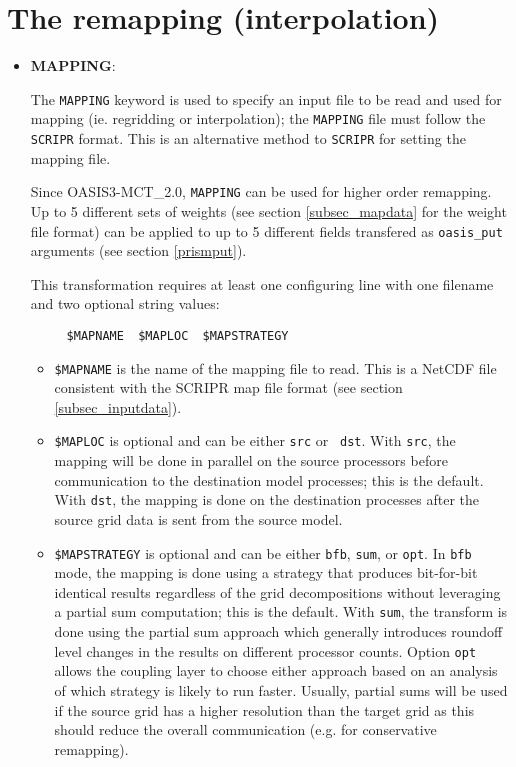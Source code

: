 
\section{The remapping (interpolation)}
\label{subsec_interp}

\begin{itemize}

\item {\bf MAPPING}:

  The {\tt MAPPING} keyword is used to specify an input file to be
  read and used for mapping (ie. regridding or interpolation); the
  {\tt MAPPING} file must follow the {\tt SCRIPR} format.  This is an
  alternative method to {\tt SCRIPR} for setting the mapping file.
 
  Since OASIS3-MCT\_2.0, {\tt MAPPING} can be used for higher order
  remapping. Up to 5 different sets of weights (see section
  \ref{subsec_mapdata} for the weight file format) can be applied to
  up to 5 different fields transfered as {\tt oasis\_put} arguments
  (see section \ref{prismput}).

  This transformation requires at least one configuring line with one
  filename and two optional string values:
\begin{verbatim}
     $MAPNAME  $MAPLOC  $MAPSTRATEGY
\end{verbatim}
  \begin{itemize}
  \item {\tt \$MAPNAME} is the name of the mapping file to read.  This
    is a NetCDF file consistent with the SCRIPR map file format (see
    section \ref{subsec_inputdata}).

  \item {\tt \$MAPLOC} is optional and can be either {\tt src} or {\tt
      dst}.  With {\tt src}, the mapping will be done in parallel on
    the source processors before communication to the destination
    model processes; this is the default.  With {\tt dst}, the mapping
    is done on the destination processes after the source grid data is
    sent from the source model.

  \item {\tt \$MAPSTRATEGY} is optional and can be either {\tt bfb},
    {\tt sum}, or {\tt opt}.  In {\tt bfb} mode, the mapping is done
    using a strategy that produces bit-for-bit identical results
    regardless of the grid decompositions without leveraging a partial
    sum computation; this is the default.  With {\tt sum}, the
    transform is done using the partial sum approach which generally
    introduces roundoff level changes in the results on different
    processor counts. Option {\tt opt} allows the coupling layer to
    choose either approach based on an analysis of which strategy is
    likely to run faster. Usually, partial sums will be used if the
    source grid has a higher resolution than the target grid as this
    should reduce the overall communication (e.g. for conservative
    remapping).


\end{itemize}
\end{itemize}
